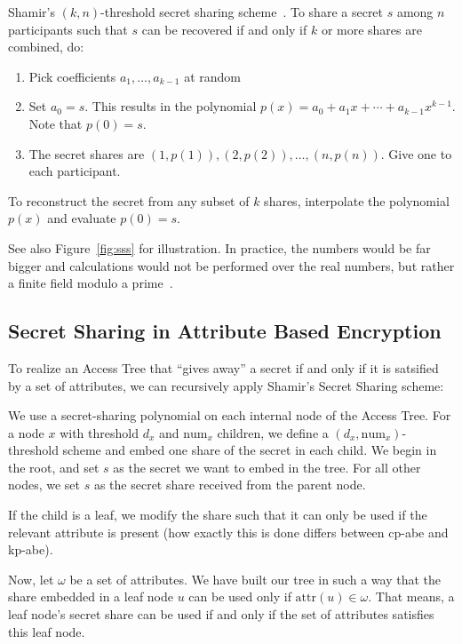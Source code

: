 

\begin{definition}
    Shamir's $(k, n)$-threshold secret sharing scheme~\cite{shamir_how_1979}.
    To share a secret $s$ among $n$ participants such that $s$ can be recovered if and only if $k$ or more shares are combined, do:
    \begin{enumerate}
        \item Pick coefficients $a_1, ..., a_{k-1}$ at random 
        \item Set $a_0 = s$. This results in the polynomial $p(x) = a_0 + a_1x + \cdots + a_{k-1}x^{k-1}$. Note that $p(0) = s$.
        \item The secret shares are $(1, p(1)), (2, p(2)), \dots, (n, p(n))$. Give one to each participant.
    \end{enumerate}
    To reconstruct the secret from any subset of $k$ shares, interpolate the polynomial $p(x)$ and evaluate $p(0) = s$. 
\end{definition}

See also Figure~\ref{fig:sss} for illustration.
In practice, the numbers would be far bigger and calculations would not be performed over the real numbers, but rather a finite field modulo a prime~\cite{shamir_how_1979}.

\subsection{Secret Sharing in Attribute Based Encryption}\label{sec:lss-in-access-trees}
To realize an Access Tree that ``gives away'' a secret if and only if it is satsified by a set of attributes, we can recursively apply Shamir's Secret Sharing scheme:



We use a secret-sharing polynomial on each internal node of the Access Tree.
For a node $x$ with threshold $d_x$ and $\text{num}_x$ children, we define a $(d_x, \text{num}_x)$-threshold scheme and embed one share of the secret in each child.
We begin in the root, and set $s$ as the secret we want to embed in the tree.
For all other nodes, we set $s$ as the secret share received from the parent node.

If the child is a leaf, we modify the share such that it can only be used if the relevant attribute is present (how exactly this is done differs between \acrshort{cp-abe} and \acrshort{kp-abe}).

Now, let $\omega$ be a set of attributes.
We have built our tree in such a way that the share embedded in a leaf node $u$ can be used only if $\text{attr}(u) \in \omega$.
That means, a leaf node's secret share can be used if and only if the set of attributes satisfies this leaf node.

